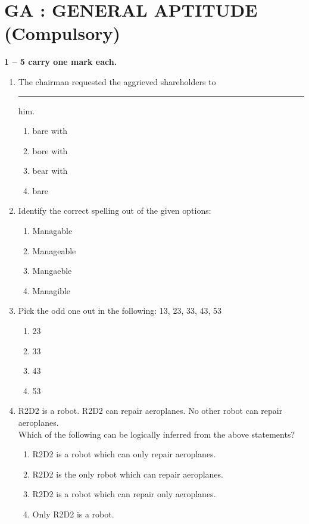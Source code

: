 \documentclass[journal,12pt,onecolumn]{IEEEtran}
\begin{document}
\section*{\centering GA : GENERAL APTITUDE (Compulsory)}
\noindent \textbf{ 1 --  5 carry one mark each.}
\begin{enumerate}[label=\arabic*.]

\item The chairman requested the aggrieved shareholders to \rule{3cm}{0.1pt} him.
\begin{multicols}{4}
\begin{enumerate}[label=(\Alph*)]
\item bare with
\item bore with
\item bear with
\item bare
\end{enumerate}
\end{multicols}

\item Identify the correct spelling out of the given options:
\begin{multicols}{4}
\begin{enumerate}[label=(\Alph*)]
\item Managable
\item Manageable
\item Mangaeble
\item Managible
\end{enumerate}
\end{multicols}

\item Pick the odd one out in the following: 13, 23, 33, 43, 53
\begin{multicols}{4}
\begin{enumerate}[label=(\Alph*)]
\item 23
\item 33
\item 43
\item 53
\end{enumerate}
\end{multicols}

\item R2D2 is a robot. R2D2 can repair aeroplanes. No other robot can repair aeroplanes.\\
Which of the following can be logically inferred from the above statements?
\begin{multicols}{2}
\begin{enumerate}[label=(\Alph*)]
\item R2D2 is a robot which can only repair aeroplanes.
\item R2D2 is the only robot which can repair aeroplanes.
\item R2D2 is a robot which can repair only aeroplanes.
\item Only R2D2 is a robot.
\end{enumerate}
\end{multicols}


\end{enumerate}
\end{document}
